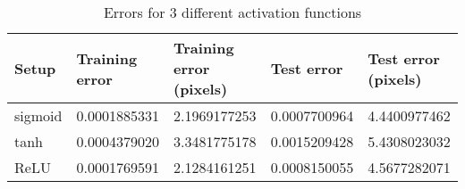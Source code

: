 \begin{table}[h!]
\centering
\footnotesize
\begin{tabular}{|l|l|l|l|l|}
	\hline
		\textbf{Setup} & \textbf{Training error} & \textbf{Training error (pixels)} & \textbf{Test error} & \textbf{Test error (pixels)}\\
	\hline
		sigmoid	& 0.0001885331%
				& 2.1969177253%
				& 0.0007700964%
				& 4.4400977462%
				\\
	\hline
		tanh 	& 0.0004379020%
				& 3.3481775178%
				& 0.0015209428%
				& 5.4308023032%
				\\
	\hline
		ReLU	& 0.0001769591%
				& 2.1284161251%
				& 0.0008150055%
				& 4.5677282071%
				\\
	\hline
	\end{tabular}
	\normalsize
	\caption{Errors for 3 different activation functions}
	\label{tab:cnn_errors_activation_functions}
\end{table}
